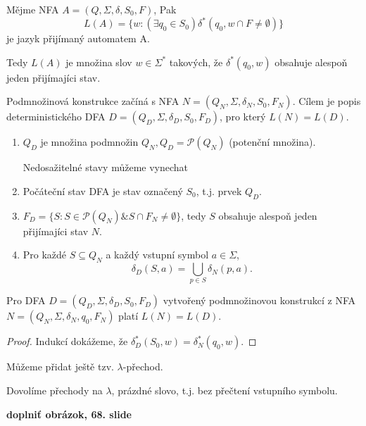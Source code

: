 \documentclass[../main.tex]{subfiles}
\begin{document}
\begin{definition}
    Mějme NFA $A = (Q,\Sigma, \delta, S_0, F)$, Pak
    \[L(A) = \{w : (\exists q_0 \in S_0) \delta^*(q_0,w \cap F \neq \emptyset)\}\]
    je jazyk přijímaný automatem A.
    
    Tedy $L(A)$ je množina slov $w \in \Sigma^*$ takových, že $\delta^*(q_0,w)$ obsahuje alespoň jeden přijímajíci stav.
\end{definition}

\begin{algorithm}
    Podmnožinová konstrukce začíná s NFA $N = (Q_N,\Sigma, \delta_N, S_0, F_N)$. Cílem je popis deterministického
    DFA $D = (Q_D,\Sigma, \delta_D, S_0, F_D)$, pro který $L(N) = L(D)$.
    \begin{enumerate}
        \item $Q_D$ je množina podmnožin $Q_N,Q_D = \mathcal{P}(Q_N)$ (potenční množina).
        \begin{remark}
            Nedosažitelné stavy můžeme vynechat
        \end{remark}
        \item Počáteční stav DFA je stav označený $S_0$, t.j. prvek $Q_D$.
        \item $F_D = \{S : S\in \mathcal{P}(Q_N) \& S\cap F_N \neq \emptyset\}$, tedy $S$ obsahuje alespoň jeden přijímajíci stav $N$.
        \item Pro každé $S \subseteq Q_N$ a každý vstupní symbol $a \in \Sigma$,
        \[\delta_D(S,a) = \bigcup_{p\in S} \delta_N(p,a).\]
    \end{enumerate}
\end{algorithm}

\begin{theorem}
    Pro DFA $D = (Q_D,\Sigma, \delta_D, S_0, F_D)$ vytvořený podmnožinovou konstrukcí z NFA $N = (Q_N,\Sigma, \delta_N,q_0,F_N)$ platí $L(N) = L(D)$.
\end{theorem}
\begin{proof}
    Indukcí dokážeme, že $\delta^*_D(S_0,w) = \delta^*_N(q_0,w).$
\end{proof}

Můžeme přidat ještě tzv. $\lambda$-přechod.

\begin{definition}
    Dovolíme přechody na $\lambda$, prázdné slovo, t.j. bez přečtení vstupního symbolu.
    
    \textbf{doplniť obrázok, 68. slide}
\end{definition}
\end{document}
